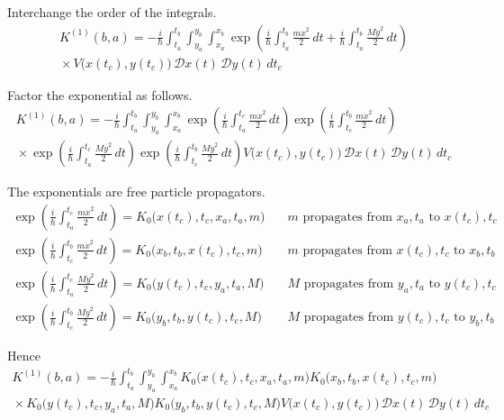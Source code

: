 Interchange the order of the integrals.
\begin{multline*}
K^{(1)}(b,a)=-\frac{i}{\hbar}\int_{t_a}^{t_b}\int_{y_a}^{y_b}\int_{x_a}^{x_b}
\exp\left(\frac{i}{\hbar}\int_{t_a}^{t_b}\frac{m\dot x^2}{2}\,dt
+\frac{i}{\hbar}\int_{t_a}^{t_b}\frac{M\dot y^2}{2}\,dt\right)
\\
{}\times V\bigl(x(t_c),y(t_c)\bigr)
\,\mathscr Dx(t)\,\mathscr Dy(t)\,dt_c
\end{multline*}

Factor the exponential as follows.
\begin{multline*}
K^{(1)}(b,a)=-\frac{i}{\hbar}\int_{t_a}^{t_b}\int_{y_a}^{y_b}\int_{x_a}^{x_b}
\exp\left(\frac{i}{\hbar}\int_{t_a}^{t_c}\frac{m\dot x^2}{2}\,dt\right)
\exp\left(\frac{i}{\hbar}\int_{t_c}^{t_b}\frac{m\dot x^2}{2}\,dt\right)
\\
{}\times
\exp\left(\frac{i}{\hbar}\int_{t_a}^{t_c}\frac{M\dot y^2}{2}\,dt\right)
\exp\left(\frac{i}{\hbar}\int_{t_c}^{t_b}\frac{M\dot y^2}{2}\,dt\right)
V\bigl(x(t_c),y(t_c)\bigr)
\,\mathscr Dx(t)\,\mathscr Dy(t)\,dt_c
\end{multline*}

The exponentials are free particle propagators.
\begin{align*}
\exp\left(\frac{i}{\hbar}\int_{t_a}^{t_c}\frac{m\dot x^2}{2}\,dt\right)
=K_0\bigl(x(t_c),t_c,x_a,t_a,m\bigr)
&\quad\text{$m$ propagates from $x_a,t_a$ to $x(t_c),t_c$}
\\
\exp\left(\frac{i}{\hbar}\int_{t_c}^{t_b}\frac{m\dot x^2}{2}\,dt\right)
=K_0\bigl(x_b,t_b,x(t_c),t_c,m\bigr)
&\quad\text{$m$ propagates from $x(t_c),t_c$ to $x_b,t_b$}
\\
\exp\left(\frac{i}{\hbar}\int_{t_a}^{t_c}\frac{M\dot y^2}{2}\,dt\right)
=K_0\bigl(y(t_c),t_c,y_a,t_a,M\bigr)
&\quad\text{$M$ propagates from $y_a,t_a$ to $y(t_c),t_c$}
\\
\exp\left(\frac{i}{\hbar}\int_{t_c}^{t_b}\frac{M\dot y^2}{2}\,dt\right)
=K_0\bigl(y_b,t_b,y(t_c),t_c,M\bigr)
&\quad\text{$M$ propagates from $y(t_c),t_c$ to $y_b,t_b$}
\end{align*}

Hence
\begin{multline*}
K^{(1)}(b,a)=-\frac{i}{\hbar}\int_{t_a}^{t_b}\int_{y_a}^{y_b}\int_{x_a}^{x_b}
K_0\bigl(x(t_c),t_c,x_a,t_a,m\bigr)
K_0\bigl(x_b,t_b,x(t_c),t_c,m\bigr)
\\
{}\times
K_0\bigl(y(t_c),t_c,y_a,t_a,M\bigr)
K_0\bigl(y_b,t_b,y(t_c),t_c,M\bigr)
V\bigl(x(t_c),y(t_c)\bigr)
\,\mathscr Dx(t)\,\mathscr Dy(t)\,dt_c
\end{multline*}

